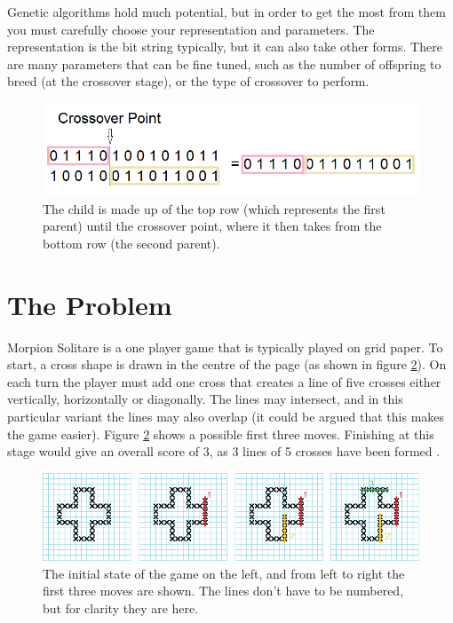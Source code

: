 \documentclass[]{report}
\begin{document}
Genetic algorithms hold much potential, but in order to get the most from them you must carefully choose your representation and parameters. The representation is the bit string typically, but it can also take other forms. There are many parameters that can be fine tuned, such as the number of offspring to breed (at the crossover stage), or the type of crossover to perform.

\begin{figure}[h!]
	\begin{center}
		\includegraphics[scale=0.4]{figures/crossover.png}
		\caption{The child is made up of the top row (which represents the first parent) until the crossover point, where it then takes from the bottom row (the second parent).}
		\label{crossoverFigure}
	\end{center}
\end{figure}

\section{The Problem}

Morpion Solitare is a one player game that is typically played on grid paper. To start, a cross shape is drawn in the centre of the page (as shown in figure \ref{morpionSolitare}). On each turn the player must add one cross that creates a line of five crosses either vertically, horizontally or diagonally. The lines may intersect, and in this particular variant the lines may also overlap (it could be argued that this makes the game easier). Figure \ref{morpionSolitare} shows a possible first three moves. Finishing at this stage would give an overall score of 3, as 3 lines of 5 crosses have been formed \cite{MorpionWebsite}.\\

\begin{figure}
	\centering
	\includegraphics[width=\textwidth]{figures/combinedthreemoves.png}
	\caption{The initial state of the game on the left, and from left to right the first three moves are shown. The lines don't have to be numbered, but for clarity they are here.}
	\label{morpionSolitare}
\end{figure}
\end{document}
